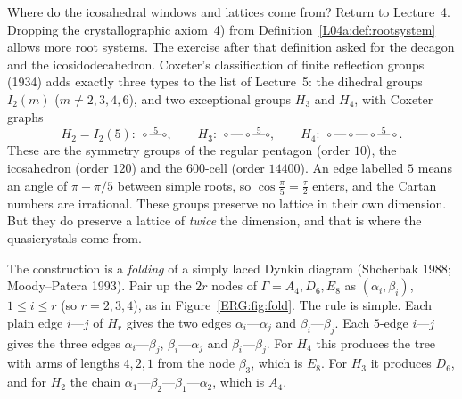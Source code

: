 Where do the icosahedral windows and lattices come from? Return to Lecture~4. Dropping the
crystallographic axiom~4) from Definition~\ref{L04a:def:rootsystem} allows more root systems. The
exercise after that definition asked for the decagon and the icosidodecahedron. Coxeter's classification
of finite reflection groups (1934) adds exactly three types to the list of Lecture~5: the dihedral groups
$I_2(m)$ ($m\neq2,3,4,6$), and two exceptional groups $H_3$ and $H_4$, with Coxeter graphs
\[
  H_2=I_2(5):\ \circ\overset{5}{\text{---}}\circ,\qquad
  H_3:\ \circ\text{---}\circ\overset{5}{\text{---}}\circ,\qquad
  H_4:\ \circ\text{---}\circ\text{---}\circ\overset{5}{\text{---}}\circ .
\]
These are the symmetry groups of the regular pentagon (order $10$), the icosahedron (order $120$) and the
$600$-cell (order $14400$). An edge labelled $5$ means an angle of $\pi-\pi/5$ between simple roots, so
$\cos\frac\pi5=\frac\tau2$ enters, and the Cartan numbers are irrational. These groups preserve no lattice
in their own dimension. But they do preserve a lattice of \emph{twice} the dimension, and that is where
the quasicrystals come from.

The construction is a \emph{folding} of a simply laced Dynkin diagram (Shcherbak 1988; Moody--Patera
1993). Pair up the $2r$ nodes of $\Gamma=A_4,D_6,E_8$ as $(\alpha_i,\beta_i)$, $1\le i\le r$ (so $r=2,3,4$), as in
Figure~\ref{ERG:fig:fold}. The rule is simple. Each plain edge $i$---$j$ of $H_r$ gives the two edges
$\alpha_i$---$\alpha_j$ and $\beta_i$---$\beta_j$. Each $5$-edge $i$---$j$ gives the three edges
$\alpha_i$---$\beta_j$, $\beta_i$---$\alpha_j$ and $\beta_i$---$\beta_j$. For $H_4$ this produces the
tree with arms of lengths $4,2,1$ from the node $\beta_3$, which is $E_8$. For $H_3$ it produces $D_6$, and
for $H_2$ the chain $\alpha_1$---$\beta_2$---$\beta_1$---$\alpha_2$, which is $A_4$.

